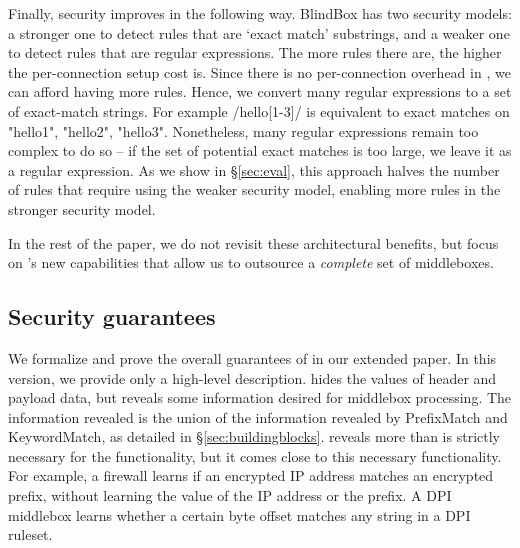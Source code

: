 Finally, security improves in the following way.
BlindBox has two security models: a stronger one to detect rules that are `exact match' substrings, and a weaker one to detect rules that are regular expressions. The more rules there are, the higher the per-connection setup cost is. 
Since there is no per-connection overhead  in \sys, we can afford having more rules. 
Hence, we convert many regular expressions to a set of exact-match strings. 
For example /hello[1-3]/ is equivalent to exact matches on "hello1", "hello2", "hello3".
Nonetheless, many regular expressions remain too complex to do so -- if the set of potential exact matches is too large, we leave it as a regular expression.
As we show in \S\ref{sec:eval}, this approach halves the number of rules that require using the weaker security model, enabling more rules in the stronger security model. 

In the rest of the paper, we do not revisit these architectural benefits, but focus  on \sys's new capabilities that allow us to outsource a {\it complete} set of middleboxes.

\subsection{Security guarantees}

We formalize and prove the overall guarantees of \sys in our extended paper. In this version, we provide only  a high-level description. 
\sys hides the values of header and payload data, but reveals some information desired for middlebox processing. The information revealed is the union of the information revealed by PrefixMatch and KeywordMatch, as detailed in \S\ref{sec:buildingblocks}. \sys reveals more than is  strictly necessary for the functionality, but it comes  close to this necessary functionality.  For example, a firewall learns if an encrypted IP address matches an encrypted prefix, without learning the value of the IP address or the prefix. A DPI middlebox learns whether a certain byte offset matches any string in a DPI ruleset. 

